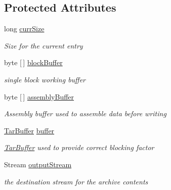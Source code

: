 \subsection*{Protected Attributes}
\begin{DoxyCompactItemize}
\item 
long \hyperlink{class_i_c_sharp_code_1_1_sharp_zip_lib_1_1_tar_1_1_tar_output_stream_abe4e3aeed770f72702cfdf299afc56cf}{curr\+Size}
\begin{DoxyCompactList}\small\item\em Size for the current entry \end{DoxyCompactList}\item 
byte \mbox{[}$\,$\mbox{]} \hyperlink{class_i_c_sharp_code_1_1_sharp_zip_lib_1_1_tar_1_1_tar_output_stream_aaa7fe07d3fe24316c6b3d85471897c66}{block\+Buffer}
\begin{DoxyCompactList}\small\item\em single block working buffer \end{DoxyCompactList}\item 
byte \mbox{[}$\,$\mbox{]} \hyperlink{class_i_c_sharp_code_1_1_sharp_zip_lib_1_1_tar_1_1_tar_output_stream_a9a9684b64869d1db25f3b8ff15f160c6}{assembly\+Buffer}
\begin{DoxyCompactList}\small\item\em \textquotesingle{}Assembly\textquotesingle{} buffer used to assemble data before writing \end{DoxyCompactList}\item 
\hyperlink{class_i_c_sharp_code_1_1_sharp_zip_lib_1_1_tar_1_1_tar_buffer}{Tar\+Buffer} \hyperlink{class_i_c_sharp_code_1_1_sharp_zip_lib_1_1_tar_1_1_tar_output_stream_a5c3ade1fecb25c00a1e17af46cac1e0b}{buffer}
\begin{DoxyCompactList}\small\item\em \hyperlink{class_i_c_sharp_code_1_1_sharp_zip_lib_1_1_tar_1_1_tar_buffer}{Tar\+Buffer} used to provide correct blocking factor \end{DoxyCompactList}\item 
Stream \hyperlink{class_i_c_sharp_code_1_1_sharp_zip_lib_1_1_tar_1_1_tar_output_stream_a521e429618eb86a1a31242ec2d8e92b0}{output\+Stream}
\begin{DoxyCompactList}\small\item\em the destination stream for the archive contents \end{DoxyCompactList}\end{DoxyCompactItemize}
